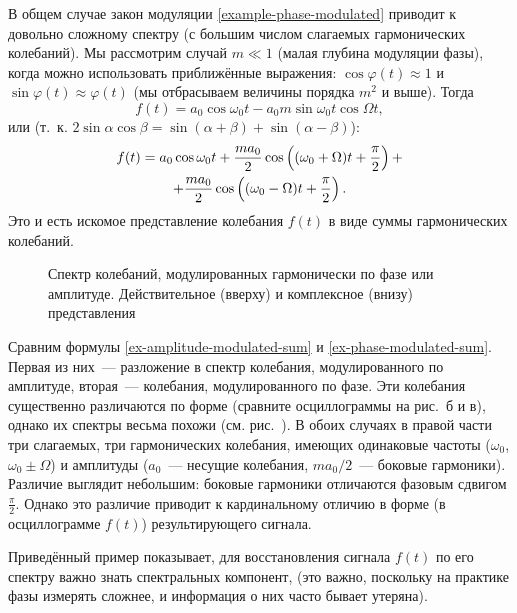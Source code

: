 В общем случае закон модуляции \eqref{example-phase-modulated} приводит к
довольно сложному спектру (с большим числом слагаемых гармонических
колебаний). Мы рассмотрим случай $m\ll 1$ (малая глубина модуляции фазы),
когда можно использовать приближённые
выражения: $\cos\varphi(t)\approx 1$ и $\sin\varphi(t)\approx\varphi(t)$
(мы отбрасываем величины порядка $m^2$ и выше). Тогда
\begin{equation*}
    f(t)=a_0\cos\omega_0t-a_0 m\sin\omega_0t\cos\Omega t,
\end{equation*}
или (т.~к. $2\sin\alpha\cos\beta=\sin(\alpha+\beta)+\sin(\alpha-\beta)$):
\begin{multline}
    \eqmark{ex-phase-modulated-sum}
f(t)=a_0\cos\omega_0t+\frac{ma_0}{2}\cos
\left((\omega_0+\Omega)t+\frac{\pi}{2}\right)+\\
+\frac{ma_0}{2}\cos\left((\omega_0-\Omega)t+\frac{\pi}{2}\right).
\end{multline}
Это и есть искомое представление колебания $f(t)$ в виде суммы гармонических
колебаний.

\begin{figure}[h]
\centering
{}
    \caption{Спектр колебаний, модулированных гармонически по фазе или амплитуде.
        Действительное (вверху) и комплексное (внизу) представления}
\end{figure}

Сравним формулы \eqref{ex-amplitude-modulated-sum} и \eqref{ex-phase-modulated-sum}.
Первая из них~--- разложение в спектр колебания, модулированного по амплитуде,
вторая~--- колебания, модулированного по фазе. Эти колебания существенно различаются
по форме (сравните осциллограммы на рис.~б
и в), однако их спектры весьма похожи
(см. рис.~). В обоих случаях в правой части три
слагаемых, три гармонических колебания, имеющих одинаковые частоты ($\omega_0$,
$\omega_0\pm\Omega$) и амплитуды ($a_0$~--- несущие колебания, $ma_0/2$~---
боковые гармоники). Различие выглядит небольшим: боковые гармоники отличаются
фазовым сдвигом $\frac{\pi}{2}$. Однако это различие приводит к кардинальному
отличию в форме (в осциллограмме $f(t)$) результирующего сигнала.

Приведённый пример показывает, для восстановления сигнала $f(t)$ по его спектру важно
знать  спектральных компонент, 
(это важно, поскольку на практике фазы измерять сложнее, и информация о
них часто бывает утеряна).

